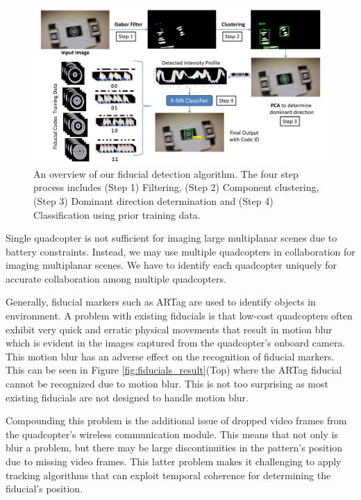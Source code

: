\begin{figure}[h!]
\centering
\includegraphics[width=0.98\linewidth]{figures/fiducial/overall_flow}
\caption[Overall Workflow of blur resilient fiducial detection algorithm]{An
overview of our fiducial detection algorithm.
    The four step process includes (Step 1) Filtering,
    (Step 2) Component clustering, (Step 3) Dominant direction determination
    and (Step 4) Classification using prior training data.}
 \label{fig:fiducial_workflow}
\end{figure}

Single quadcopter is not sufficient for imaging large multiplanar scenes due to
battery constraints. Instead, we may use multiple quadcopters in
collaboration for imaging multiplanar scenes. We have to identify each
quadcopter uniquely for accurate collaboration among multiple quadcopters. 

Generally, fiducial markers such as ARTag\cite{Fiala05} are used to identify
objects in environment. A problem with existing fiducials is that low-cost
quadcopters often exhibit very quick and erratic physical movements that result
in motion blur which is evident in the images captured from the quadcopter's
onboard camera. This motion blur has an adverse effect on the recognition of fiducial
markers. This can be seen in Figure \ref{fig:fiducials_result}(Top) where the
ARTag fiducial cannot be recognized due to motion blur. This is not too
surprising as most existing fiducials are not designed to handle motion blur.

Compounding this problem is the additional issue of dropped video
frames from the quadcopter's wireless communication module. This means
that not only is blur a problem, but there may be large
discontinuities in the pattern's position due to missing video
frames. This latter problem makes it challenging to apply tracking algorithms
that can exploit temporal coherence for determining the fiducial's position.


